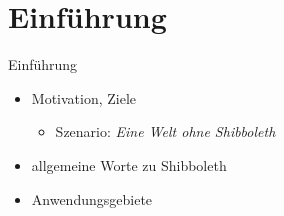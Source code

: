 
\section{Einführung}

\begin{frame}{Einführung}
    \begin{itemize}
        \item Motivation, Ziele
        \begin{itemize}
            \item Szenario: \emph{Eine Welt ohne Shibboleth}
        \end{itemize}
        \item allgemeine Worte zu Shibboleth
        \item Anwendungsgebiete
    \end{itemize}
\end{frame}
